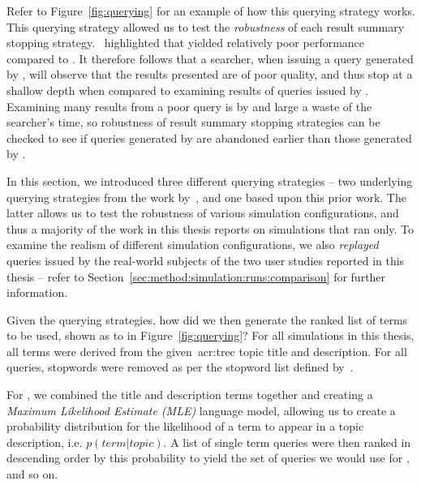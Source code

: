 Refer to Figure~\ref{fig:querying} for an example of how this querying strategy works. This querying strategy allowed us to test the \emph{robustness} of each result summary stopping strategy.~\cite{keskustalo2009querying} highlighted that  yielded relatively poor performance compared to . It therefore follows that a searcher, when issuing a query generated by , will observe that the results presented are of poor quality, and thus stop at a shallow depth when compared to examining results of queries issued by . Examining many results from a poor query is by and large a waste of the searcher's time, so robustness of result summary stopping strategies can be checked to see if queries generated by  are abandoned earlier than those generated by .

In this section, we introduced three different querying strategies -- two underlying querying strategies from the work by~\cite{keskustalo2009querying}, and one based upon this prior work. The latter allows us to test the robustness of various simulation configurations, and thus a majority of the work in this thesis reports on simulations that ran  only. To examine the realism of different simulation configurations, we also \emph{replayed} queries issued by the real-world subjects of the two user studies reported in this thesis -- refer to Section~\ref{sec:method:simulation:runs:comparison} for further information.

Given the querying strategies, how did we then generate the ranked list of terms to be used, shown as  to  in Figure~\ref{fig:querying}? For all simulations in this thesis, all terms were derived from the given~\gls{acr:trec} topic title and description. For all queries, stopwords were removed as per the stopword list defined by~\cite{fox1992stopwords}.

For , we combined the title and description terms together and creating a \emph{Maximum Likelihood Estimate (MLE)} language model, allowing us to create a probability distribution for the likelihood of a term to appear in a topic description, i.e. $p(term|topic)$. A list of single term queries were then ranked in descending order by this probability to yield the set of queries we would use for ,  and so on.

